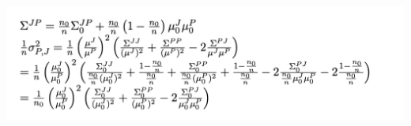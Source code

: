 \documentclass[specialist,
               substylefile = spbu_report.rtx,
               subf,href,colorlinks=true, 12pt]{disser}
\begin{document}
\begin{enumerate}
        \includegraphics[width = 6in]{Снимок экрана 2023-10-16 в 22.10.53.png}
        \newline
    
    
    \end{enumerate} 
        
\end{document}
